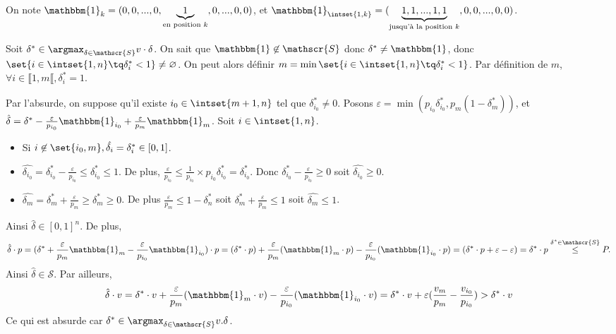 \documentclass{scrartcl}
\begin{document}
					\rem On note $\mathbbm{1}_k = (0,0,...,0,\underbrace{1}_{\text{en position } k},0,...,0,0)$,
					et $\mathbbm{1}_{\intset{1,k}} = (\underbrace{1,1,...,1,1}_{\text{jusqu'à la position } k},0,0,...,0,0)$.

					Soit $\delta^* \in \argmax_{\delta \in \mathscr{S}} v\cdot\delta$. On sait que $\mathbbm{1} \not \in \mathscr{S}$ donc $\delta^* \neq \mathbbm{1}$,
					donc $\set{i\in\intset{1,n} \tq \delta_i^* < 1} \neq \varnothing$.
					On peut alors définir $m = \min\set{i\in\intset{1,n} \tq \delta_i^* < 1}$. Par définition de $m$, $\forall i \in \llbracket1,m\llbracket, \delta_i^* = 1$.
		 
					\begin{demo}
						\item Par l'absurde, on suppose qu'il existe $i_0 \in \intset{m+1, n}$ tel que $\delta_{i_0}^* \neq 0$. 
						Posons $\varepsilon = \min (p_{i_0}\delta_{i_0}^*, p_m(1-\delta_m^*))$, et 
						$\hat{\delta} = \delta^* - \frac{\varepsilon}{p_{i_0}} \mathbbm{1}_{i_0} + \frac{\varepsilon}{p_m} \mathbbm{1}_m$. 
						Soit $i \in \intset{1,n}$.
						\begin{itemize}
							\item Si $i \not\in \set{i_0,m}, \hat{\delta_i} = \delta_i^* \in [0,1]$.
							\item $\hat{\delta_{i_0}} = \delta_{i_0}^* - \frac{\varepsilon}{p_{i_0}} \leq \delta_{i_0}^* \leq 1$.
								De plus, $\frac{\varepsilon}{p_{i_0}} \leq \frac{1}{p_{i_0}} \times p_{i_0} \delta_{i_0}^* = \delta_{i_0}^*$.
								Donc $\delta_{i_0}^* - \frac{\varepsilon}{p_{i_0}} \geq 0$ soit $\hat{\delta_{i_0}} \geq 0$.
							\item $\hat{\delta_m} = \delta_m^* + \frac{\varepsilon}{p_m} \geq \delta_m^* \geq 0$.
								De plus $\frac{\varepsilon}{p_m} \leq 1 - \delta_n^*$ soit $\delta_m^* + \frac{\varepsilon}{p_m} \leq 1$
								soit $\hat{\delta_m} \leq 1$.
						\end{itemize}
						Ainsi $\hat{\delta} \in [0,1]^n$. 
						De plus, 
						\[
							\hat{\delta}\cdot p = (\delta^* + \frac{\varepsilon}{p_m}\mathbbm{1}_m - \frac{\varepsilon}{p_{i_0}}\mathbbm{1}_{i_0})\cdot p
							= (\delta^*\cdot p) + \frac{\varepsilon}{p_m}(\mathbbm{1}_m\cdot p) - \frac{\varepsilon}{p_{i_0}}(\mathbbm{1}_{i_0}\cdot p)
							= (\delta^*\cdot p + \varepsilon - \varepsilon) = \delta^*\cdot p \stackrel{\delta^* \in \mathscr{S}}{\leq} P.
						\]
						Ainsi $\hat{\delta} \in \mathscr{S}$.
						Par ailleurs, 
						\[ 
							\hat{\delta} \cdot v =  
							\delta^*\cdot v + \frac{\varepsilon}{p_m}(\mathbbm{1}_m \cdot v) - \frac{\varepsilon}{p_{i_0}}(\mathbbm{1}_{i_0} \cdot v) = 
							\delta^* \cdot v + \varepsilon(\frac{v_m}{p_m} - \frac{v_{i_0}}{p_{i_0}}) > \delta^* \cdot v 
						\]
						Ce qui est absurde car $\delta^* \in \argmax_{\delta \in \mathscr{S}} v.\delta$.
					\end{demo}
\end{document}
